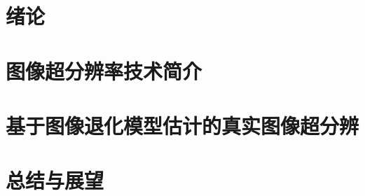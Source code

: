 \documentclass{xduugthesis}
\begin{document}
\chapter{绪论}

\chapter{图像超分辨率技术简介}

\chapter{基于图像退化模型估计的真实图像超分辨}

\chapter{总结与展望}

\end{document}
